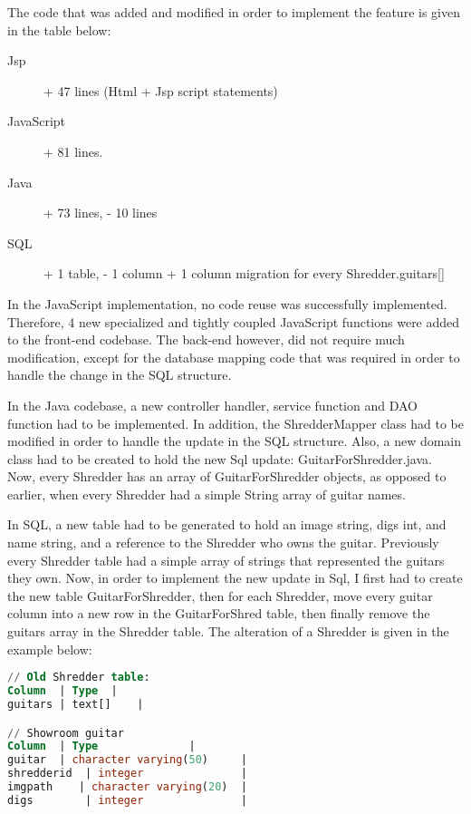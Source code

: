 The code that was added and modified in order to implement the feature is given in the table below:
\begin{description}
  \item[Jsp] + 47 lines (Html + Jsp script statements)
  \item[JavaScript] + 81 lines. 
  \item[Java] + 73 lines, - 10 lines 
  \item[SQL] + 1 table, - 1 column + 1 column migration for every Shredder.guitars[] 
\end{description}

In the JavaScript implementation, no code reuse was successfully implemented. Therefore, 4 new specialized and tightly coupled JavaScript functions were added to the front-end codebase. The back-end however, did not require much modification, except for the database mapping code that was required in order to handle the change in the SQL structure.

In the Java codebase, a new controller handler, service function and DAO function had to be implemented. In addition, the ShredderMapper class had to be modified in order to handle the update in the SQL structure. Also, a new domain class had to be created to hold the new Sql update: GuitarForShredder.java. Now, every Shredder has an array of GuitarForShredder objects, as opposed to earlier, when every Shredder had a simple String array of guitar names. 

In SQL, a new table had to be generated to hold an image string, digs int, and name string, and a reference to the Shredder who owns the guitar. Previously every Shredder table had a simple array of strings that represented the guitars they own. Now, in order to implement the new update in Sql, I first had to create the new table GuitarForShredder, then for each Shredder, move every guitar column into a new row in the GuitarForShred table, then finally remove the guitars array in the Shredder table. 
The alteration of a Shredder is given in the example below: 
\begin{lstlisting}[language=SQL]
// Old Shredder table:
Column	| Type	|
guitars	| text[] 	|

// Showroom guitar
Column	| Type				|
guitar	| character varying(50) 	|
shredderid	| integer				|
imgpath    | character varying(20) 	|
digs      	| integer				|
\end{lstlisting}



%

